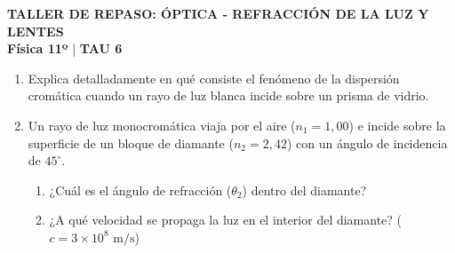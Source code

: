 \documentclass[11pt, letterpaper]{article}
\newif\ifshowanswers
\newcommand{\answer}[1]{ 
	\ifshowanswers 
	\par\vspace{0.15cm} 
	\begin{tcolorbox}[colback=blue!5!white, colframe=blue!60!white, arc=1mm, boxrule=0.5pt, title=\textbf{\footnotesize SOLUCIÓN PASO A PASO (DOCENTE)}] 
		\color{blue!80!black}\footnotesize #1 
	\end{tcolorbox} 
	\par\vspace{0.15cm} 
	\else 
	\par\vspace{0.3cm} 
	\fi 
}
\begin{document}
 
	
	\begin{center} 
		{\large \textbf{TALLER DE REPASO: ÓPTICA - REFRACCIÓN DE LA LUZ Y LENTES}}\\[0.1cm] 
		{\small \textbf{Física 11º} \quad  | \quad \textbf{TAU 6}} 
	\end{center} 
	
	
	
	\begin{enumerate}[leftmargin=*, itemsep=0.8cm] 
		
		\item Explica detalladamente en qué consiste el fenómeno de la dispersión cromática cuando un rayo de luz blanca incide sobre un prisma de vidrio. 
		\answer{ 
			\textbf{Concepto:} La dispersión cromática ocurre porque el índice de refracción ($n$) de un material transparente varía según la frecuencia de la luz incidente.\\ 
			\textbf{Explicación física:} La luz violeta posee una mayor frecuencia que la roja. En el vidrio, las frecuencias más altas experimentan un mayor índice de refracción ($n_{\text{violeta}} > n_{\text{roja}}$), lo que provoca una mayor disminución de su velocidad y un mayor ángulo de desviación al refractarse. 
		} 
		
		\item  Un rayo de luz monocromática viaja por el aire ($n_1 = 1,00$) e incide sobre la superficie de un bloque de diamante ($n_2 = 2,42$) con un ángulo de incidencia de $45^\circ$. 
		\begin{enumerate}[label=\alph*), itemsep=0.2cm] 
			\item ¿Cuál es el ángulo de refracción ($\theta_2$) dentro del diamante? 
			\item ¿A qué velocidad se propaga la luz en el interior del diamante? ($c = 3 \times 10^8\text{ m/s}$) 
		\end{enumerate} 
		\answer{ 
			a) Ley de Snell: $n_1 \sin\theta_1 = n_2 \sin\theta_2 \implies 1,00 \cdot \sin(45^\circ) = 2,42 \cdot \sin\theta_2$.\\ 
			$\sin\theta_2 = \frac{0,7071}{2,42} \approx 0,2922 \implies \theta_2 = \arcsin(0,2922) \approx \mathbf{16,99^\circ}$.\\[0.1cm] 
			b) Velocidad en el medio: $v = \frac{c}{n_2} = \frac{3 \times 10^8\text{ m/s}}{2,42} \approx \mathbf{1,24 \times 10^8\text{ m/s}}$. 
		} 
		

\end{enumerate}
\end{document}
